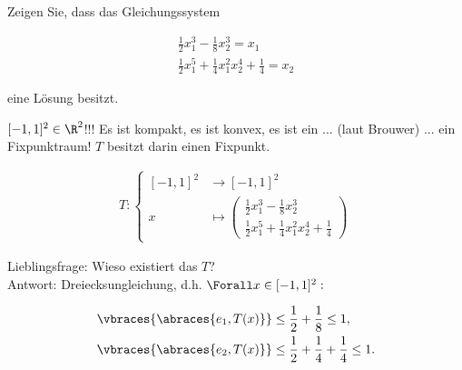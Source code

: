 \begin{exercise}

Zeigen Sie, dass das Gleichungssystem

\begin{align*}
  \frac{1}{2} x_1^3 - \frac{1}{8} x_2^3 = x_1 \\
  \frac{1}{2} x_1^5 + \frac{1}{4} x_1^2 x_2^4 + \frac{1}{4} = x_2
\end{align*}

eine Lösung besitzt.

\end{exercise}

\begin{solution}

$[-1, 1]^2 \in \R^2$!!! Es ist kompakt, es ist konvex, es ist ein ... (laut Brouwer) ... ein Fixpunktraum! $T$ besitzt darin einen Fixpunkt.

\begin{align*}
  T:
  \begin{cases}
    [-1, 1]^2 & \to [-1, 1]^2 \\
    x         & \mapsto
    \begin{pmatrix}
      \frac{1}{2} x_1^3 - \frac{1}{8} x_2^3 \\
      \frac{1}{2} x_1^5 + \frac{1}{4} x_1^2 x_2^4 + \frac{1}{4}
    \end{pmatrix}
  \end{cases}
\end{align*}

Lieblingsfrage: Wieso existiert das $T$? \\
Antwort: Dreiecksungleichung, d.h. $\Forall x \in [-1, 1]^2:$

\begin{align*}
  \vbraces{\abraces{e_1, T(x)}} & \leq
  \frac{1}{2} + \frac{1}{8} \leq
  1, \\
  \vbraces{\abraces{e_2, T(x)}} & \leq
  \frac{1}{2} + \frac{1}{4} + \frac{1}{4} \leq
  1.
\end{align*}

\end{solution}
